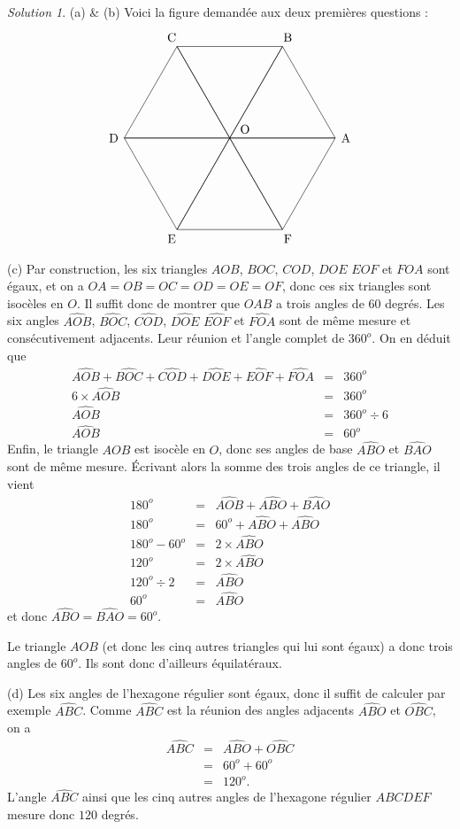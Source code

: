 \documentclass[14pt]{article}
\theoremstyle{remark}
\newtheorem*{sol}{Solution}
\newcounter{n}
\theoremstyle{plain}
\begin{document}
\begin{sol}
(a) \& (b) Voici la figure demandée aux deux premières questions : 
\[\begin{tikzpicture}
\draw(0,0)--(0:3)--(60:3)--(0,0);
\draw(0,0)--(60:3)--(120:3)--(0,0);
\draw(0,0)--(120:3)--(180:3)--(0,0);
\draw(0,0)--(180:3)--(240:3)--(0,0);
\draw(0,0)--(240:3)--(300:3)--(0,0);
\draw(0,0)--(300:3)--(360:3)--(0,0);
\draw (30:.5) node{O};
\draw(0:3.3) node{A};
\draw(60:3.3) node{B};
\draw(120:3.3) node{C};
\draw(180:3.3) node{D};
\draw(240:3.3) node{E};
\draw(300:3.3) node{F};
\end{tikzpicture}\]
(c) Par construction, les six triangles $AOB$, $BOC$, $COD$, $DOE$ $EOF$ et $FOA$ sont égaux, et on a $OA=OB=OC=OD=OE=OF$, donc ces six triangles sont isocèles en $O$. Il suffit donc de montrer que $OAB$ a trois angles de $60$ degrés. 
Les six angles $\widehat{AOB}$, $\widehat{BOC}$, $\widehat{COD}$, $\widehat{DOE}$ $\widehat{EOF}$ et $\widehat{FOA}$ sont de même mesure et consécutivement adjacents. Leur réunion et l'angle complet de $360^o$. On en déduit que \begin{eqnarray*} 
\widehat{AOB}+\widehat{BOC}+\widehat{COD}+\widehat{DOE}+\widehat{EOF}+\widehat{FOA}&=& 360^o\\
6\times \widehat{AOB} &=& 360^o\\
\widehat{AOB} &=& 360^o\div 6 \\
\widehat{AOB} &=& 60^o\end{eqnarray*}
Enfin, le triangle $AOB$ est isocèle en $O$, donc ses angles de base $\widehat{ABO}$ et $\widehat{BAO}$ sont de même mesure. Écrivant alors la somme des trois angles de ce triangle, il vient 
\begin{eqnarray*} 180^o &=& \widehat{AOB} + \widehat{ABO} + \widehat{BAO} \\
180^o &=& 60^o + \widehat{ABO} + \widehat{ABO} \\
180^o -60^o &=& 2\times \widehat{ABO}\\
120^o &=& 2\times \widehat{ABO}\\
120^o\div 2 &=& \widehat{ABO}\\
60^o&=& \widehat{ABO}\end{eqnarray*}
et donc $\widehat{ABO}=\widehat{BAO}=60^o$. 

Le triangle $AOB$ (et donc les cinq autres triangles qui lui sont égaux) a donc trois angles de $60^o$. Ils sont donc d'ailleurs équilatéraux. 

(d) Les six angles de l'hexagone régulier sont égaux, donc il suffit de calculer par exemple $\widehat{ABC}$. Comme $\widehat{ABC}$ est la réunion des angles adjacents $\widehat{ABO}$ et $\widehat{OBC}$, on a 
\begin{eqnarray*}
\widehat{ABC} &=& \widehat{ABO} + \widehat{OBC} \\
&=& 60^o+60^o\\
&=& 120^o.
\end{eqnarray*}
L'angle $\widehat{ABC}$ ainsi que les cinq autres angles de l'hexagone régulier $ABCDEF$ mesure donc $120$ degrés. 
\end{sol}
\end{document}

